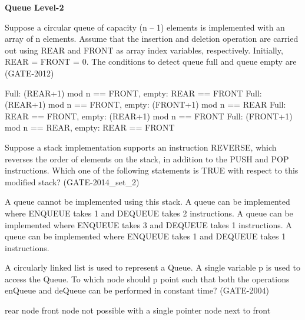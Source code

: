 
\centerline{\textbf{ \LARGE Queue Level-2}}

\begin{questyle}
  \question  Suppose a circular queue of capacity (n – 1) elements is implemented with an array of n elements.
            Assume that the insertion and deletion operation are carried out using REAR and FRONT as array index variables, respectively. Initially, REAR = FRONT = 0. The conditions to detect queue full and queue empty are  (GATE-2012)

  \begin{choices}
    \CorrectChoice  Full: (REAR+1) mod n == FRONT, empty: REAR == FRONT
    \choice         Full: (REAR+1) mod n == FRONT, empty: (FRONT+1) mod n == REAR
    \choice         Full: REAR == FRONT, empty: (REAR+1) mod n == FRONT
    \choice         Full: (FRONT+1) mod n == REAR, empty: REAR == FRONT
  \end{choices}
\end{questyle}

\begin{questyle}
  \question  Suppose a stack implementation supports an instruction REVERSE, which reverses the
            order of elements on the stack, in addition to the PUSH and POP instructions. Which
            one of the following statements is TRUE with respect to this modified stack?  (GATE-2014\_set\_2)

  \begin{choices}
    \choice         A queue cannot be implemented using this stack.
    \choice         A queue can be implemented where ENQUEUE takes 1 and DEQUEUE takes 2 instructions.
    \CorrectChoice  A queue can be implemented where ENQUEUE takes 3 and DEQUEUE takes 1 instructions.
    \choice         A queue can be implemented where ENQUEUE takes 1 and DEQUEUE takes 1 instructions.
  \end{choices}
\end{questyle}


\begin{questyle}
  \question  A circularly linked list is used to represent a Queue. A single variable p is used to access
            the Queue. To which node should p point such that both the operations enQueue and deQueue can
            be performed in constant time?  (GATE-2004)

  \begin{choices}
    \CorrectChoice  rear node
    \choice         front node
    \choice         not possible with a single pointer
    \choice         node next to front
  \end{choices}
\end{questyle}

